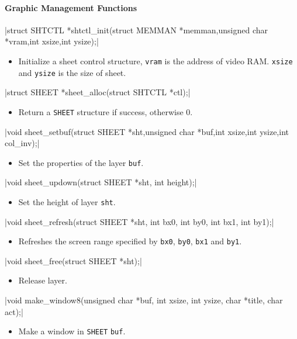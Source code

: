 \documentclass{swfcthesis}
\begin{document}
\paragraph{Graphic Management Functions}

\csingle|struct SHTCTL *shtctl_init(struct MEMMAN *memman,unsigned char *vram,int xsize,int ysize);|
\begin{itemize}
\item Initialize a sheet control structure, \texttt{vram} is the address of video
  RAM. \texttt{xsize} and \texttt{ysize} is the size of sheet.
\end{itemize}

\csingle|struct SHEET *sheet_alloc(struct SHTCTL *ctl);|
\begin{itemize}
\item Return a \texttt{SHEET} structure if success, otherwise 0.
\end{itemize}

\csingle|void sheet_setbuf(struct SHEET *sht,unsigned char *buf,int xsize,int ysize,int col_inv);|
\begin{itemize}
\item Set the properties of the layer \texttt{buf}.
\end{itemize}

\csingle|void sheet_updown(struct SHEET *sht, int height);|
\begin{itemize}
\item Set the height of layer \texttt{sht}.
\end{itemize}

\csingle|void sheet_refresh(struct SHEET *sht, int bx0, int by0, int bx1, int by1);|
\begin{itemize}
\item Refreshes the screen range specified by \texttt{bx0}, \texttt{by0}, \texttt{bx1} and
  \texttt{by1}.
\end{itemize}

\csingle|void sheet_free(struct SHEET *sht);|
\begin{itemize}
\item Release layer.
\end{itemize}

\csingle|void make_window8(unsigned char *buf, int xsize, int ysize, char *title, char act);|
\begin{itemize}
\item Make a window in \texttt{SHEET} \texttt{buf}.
\end{itemize}
\end{document}
